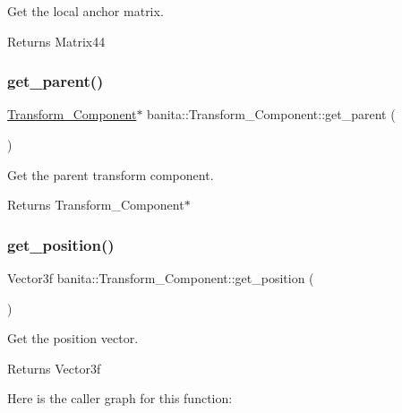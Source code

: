 Get the local anchor matrix. 

\begin{DoxyReturn}{Returns}
Matrix44 
\end{DoxyReturn}
\mbox{\label{classbanita_1_1_transform___component_a8503ea9581479c4d3a7b5e7992d669f2}} 
\subsubsection{\texorpdfstring{get\_parent()}{get\_parent()}}
{\footnotesize\ttfamily \mbox{\hyperlink{classbanita_1_1_transform___component}{Transform\+\_\+\+Component}}$\ast$ banita\+::\+Transform\+\_\+\+Component\+::get\+\_\+parent (\begin{DoxyParamCaption}{ }\end{DoxyParamCaption})\hspace{0.3cm}{\ttfamily [inline]}}



Get the parent transform component. 

\begin{DoxyReturn}{Returns}
Transform\+\_\+\+Component$\ast$ 
\end{DoxyReturn}
\mbox{\label{classbanita_1_1_transform___component_a080736ede5f09898a8b28c2b22e60c61}} 
\subsubsection{\texorpdfstring{get\_position()}{get\_position()}}
{\footnotesize\ttfamily Vector3f banita\+::\+Transform\+\_\+\+Component\+::get\+\_\+position (\begin{DoxyParamCaption}{ }\end{DoxyParamCaption})\hspace{0.3cm}{\ttfamily [inline]}}



Get the position vector. 

\begin{DoxyReturn}{Returns}
Vector3f 
\end{DoxyReturn}
Here is the caller graph for this function\+:
\mbox{\label{classbanita_1_1_transform___component_a914ced98c4598751de9448cf1491d990}} 
